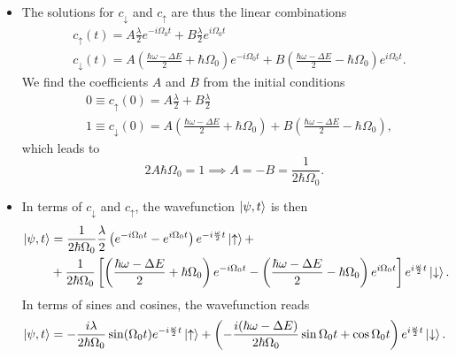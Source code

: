 \documentclass[11pt, a4paper]{article}
\newcommand{\p}{\psi}  %
\newcommand{\ua}{\uparrow}  %
\newcommand{\da}{\downarrow}  %
\begin{document}
\begin{itemize}
	\item The solutions for $ c_{\da} $ and $ c_{\ua} $ are thus the linear combinations
	\begin{align*}
		& c_{\ua}(t) = A\frac{\lambda}{2}e^{-i\Omega_{0}t} + B  \frac{\lambda}{2}e^{i\Omega_{0}t}\\
		& c_{\da}(t) = A\left(\frac{\hbar \omega - \Delta E}{2} + \hbar \Omega_{0}\right)e^{-i\Omega_{0}t} + B\left(\frac{\hbar \omega - \Delta E}{2} - \hbar \Omega_{0}\right)e^{i\Omega_{0}t}.
	\end{align*}
	We find the coefficients $ A $ and $ B $ from the initial conditions
	\begin{align*}
		&0 \equiv c_{\ua}(0) = A\frac{\lambda}{2} + B\frac{\lambda}{2}\\
		&1 \equiv c_{\da}(0) = A\left(\frac{\hbar \omega - \Delta E}{2} + \hbar \Omega_{0}\right) + B\left(\frac{\hbar \omega - \Delta E}{2} - \hbar \Omega_{0}\right),
	\end{align*}
    which leads to
	\begin{equation*}
		2A \hbar \Omega_{0} = 1 \implies A = - B = \frac{1}{2\hbar \Omega_{0}}.
	\end{equation*}
	
    \item In terms of $ c_{\da} $ and $ c_{\ua} $, the wavefunction $ \ket{\p, t} $ is then
	\begin{align*}
		\ket{\p, t} &= \frac{1}{2\hbar \Omega_{0}}\frac{\lambda}{2}\left(e^{-i \Omega_{0}t} - e^{i \Omega_{0}t} \right)e^{-i\frac{\omega}{2}t}\ket{\ua} + \\
		& + \frac{1}{2\hbar \Omega_{0}}\left[\left(\frac{\hbar \omega - \Delta E}{2} + \hbar \Omega_{0} \right)e^{-i\Omega_{0}t} - \left(\frac{\hbar \omega - \Delta E}{2} - \hbar \Omega_{0} \right)e^{i\Omega_{0}t}\right]e^{i\frac{\omega}{2}t}\ket{\da}.
	\end{align*}
	In terms of sines and cosines, the wavefunction reads
	\begin{align*}
        \ket{\p, t} = -\frac{i\lambda}{2\hbar \Omega_{0}} \sin (\Omega_{0}t)e^{-i\frac{\omega}{2}t}\ket{\ua} + \left( -\frac{i(\hbar \omega - \Delta E)}{2\hbar \Omega_{0}}\sin \Omega_{0}t + \cos \Omega_{0}t\right)e^{i\frac{\omega}{2}t}\ket{\da}.
	\end{align*}
\end{itemize}
	
\end{document}
